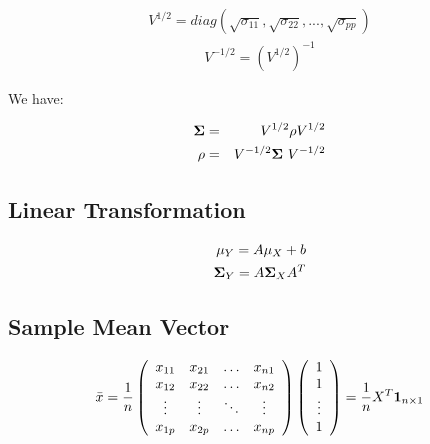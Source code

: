 \documentclass[12pt]{extarticle}
\newcommand{\<}{\langle}
\renewcommand{\>}{\rangle}
\theoremstyle{definition}
\begin{document}
\begin{eqnarray*}
V^{1/2} = diag(\sqrt{\sigma_{11}}, \sqrt{\sigma_{22}}, ..., \sqrt{\sigma_{pp}})
\end{eqnarray*}
\begin{eqnarray*}
V^{-1/2} = (V^{1/2})^{-1}
\end{eqnarray*}

We have: 
\begin{tcolorbox}
\begin{eqnarray*}
{\bf \Sigma} &=& V^{1/2}\rho V^{1/2}\\
\rho &=& V^{-1/2} {\bf \Sigma} \  V^{-1/2}
\end{eqnarray*}
\end{tcolorbox}

\subsection{Linear Transformation}
\begin{tcolorbox}[enhanced, drop fuzzy shadow, title=Linear Transformation]
\begin{align*}
\mu_Y = A\mu_X + b \\
{\bf \Sigma}_Y = A {\bf \Sigma}_X A^T
\end{align*}
\end{tcolorbox}

\subsection{Sample Mean Vector}
\begin{tcolorbox}[enhanced, drop fuzzy shadow, title=Sample Mean Vector]
\begin{eqnarray*}
\Bar{x} = \frac{1}{n}
    \left(\begin{array}{cccc}
      x_{11} & x_{21} & \ldots & x_{n1} \\
      x_{12} & x_{22} & \ldots & x_{n2} \\
      \vdots & \vdots & \ddots & \vdots \\
      x_{1p} & x_{2p} & \ldots & x_{np}
    \end{array} \right)
    \left(\begin{array}{c}
      1 \\ 1 \\ \vdots \\ 1
    \end{array} \right)
=\frac{1}{n} X^T {\bf 1}_{n \times 1}
\end{eqnarray*}
\end{tcolorbox}
\end{document}
